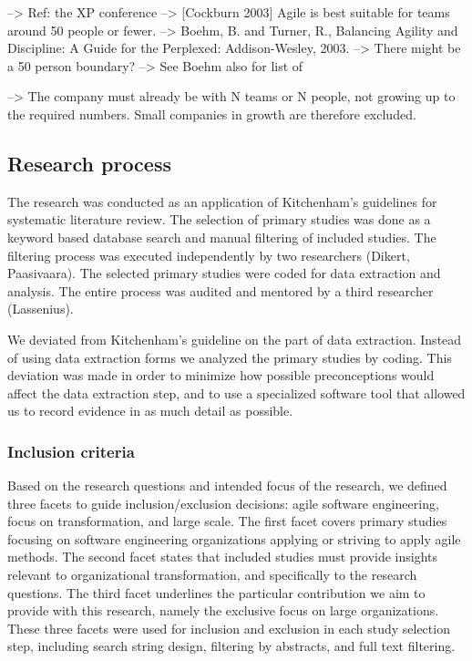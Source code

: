 \documentclass[preprint,authoryear,12pt]{elsarticle}
\begin{document}
--> Ref: the XP conference
--> [Cockburn 2003] Agile is best suitable for teams around 50 people or fewer.
--> Boehm, B. and Turner, R., Balancing Agility and Discipline: A Guide for the
    Perplexed: Addison-Wesley, 2003. --> There might be a 50 person boundary?
    --> See Boehm also for list of 

--> The company must already be with N teams or N people, not growing up to the
    required numbers. Small companies in growth are therefore excluded. 


\subsection{Research process}

The research was conducted as an application of Kitchenham's
\cite{Kitchenham2007} guidelines for systematic literature review. The selection
of primary studies was done as a keyword based database search and manual
filtering of included studies. The filtering process was executed independently
by two researchers (Dikert, Paasivaara). The selected primary studies were coded
for data extraction and analysis. The entire process was audited and mentored by
a third researcher (Lassenius).

We deviated from Kitchenham's guideline on the part of data extraction. Instead
of using data extraction forms we analyzed the primary studies by coding. This
deviation was made in order to minimize how possible preconceptions would affect
the data extraction step, and to use a specialized software tool that allowed us
to record evidence in as much detail as possible.

\subsubsection{Inclusion criteria}
\label{sec:inclusioncriteria}

Based on the research questions and intended focus of the research, we defined
three facets to guide inclusion/exclusion decisions: agile software engineering,
focus on transformation, and large scale. The first facet covers primary studies
focusing on software engineering organizations applying or striving to apply
agile methods. The second facet states that included studies must provide
insights relevant to organizational transformation, and specifically to the
research questions. The third facet underlines the particular contribution we
aim to provide with this research, namely the exclusive focus on large
organizations. These three facets were used for inclusion and exclusion in each
study selection step, including search string design, filtering by abstracts,
and full text filtering.
\end{document}
